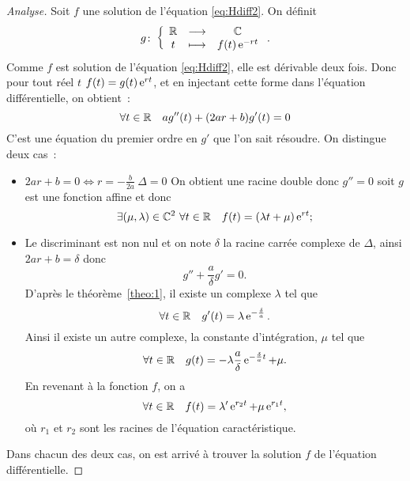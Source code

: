 \begin{proof}[Analyse] Soit $f$ une solution de l'équation \eqref{eq:Hdiff2}. On définit
  \begin{equation}
    g\colon \left\{\begin{array}{ccc} \mathbb{R} & \longrightarrow &\mathbb{C}\\ t & \longmapsto & f(t)\operatorname{e}^{-rt} \end{array} \right..
  \end{equation}
  Comme $f$ est solution de l'équation \eqref{eq:Hdiff2}, elle est dérivable deux fois. Donc pour tout réel $t$ $f(t)=g(t) \operatorname{e}^{rt}$, et en injectant cette forme dans l'équation différentielle, on obtient~:
\begin{equation}
  \forall t \in \mathbb{R} \quad ag''(t)+(2ar+b)g'(t)=0
\end{equation}
C'est une équation du premier ordre en $g'$ que l'on sait résoudre. On distingue deux cas~:
\begin{itemize}
\item $2ar+b=0 \iff r=-\frac{b}{2a} \ \Delta = 0$ On obtient une racine double donc $g''=0$ soit $g$ est une fonction affine et donc 
  \begin{equation}
   \exists (\mu,\lambda) \in \mathbb{C}^2 \ \forall t \in \mathbb{R} \quad f(t)=(\lambda t+\mu)\operatorname{e}^{rt};
  \end{equation}
\item Le discriminant est non nul et on note $\delta$ la racine carrée complexe de $\Delta$, ainsi $2ar+b=\delta$ donc 
  \begin{equation}
    g''+\frac{a}{\delta} g'=0.
  \end{equation}
D'après le théorème~\ref{theo:1}, il existe un complexe $\lambda$ tel que
\begin{equation}
  \forall t \in \mathbb{R} \quad g'(t)=\lambda \operatorname{e}^{-\frac{\delta}{a}}.
\end{equation}
Ainsi il existe un autre complexe, la constante d'intégration, $\mu$ tel que
\begin{equation}
 \forall t \in \mathbb{R} \quad g(t)=-\lambda \frac{a}{\delta} \operatorname{e}^{-\frac{\delta}{a} t} + \mu. 
\end{equation}
En revenant à la fonction $f$, on a
\begin{equation}
  \forall t \in \mathbb{R} \quad f(t)=\lambda' \operatorname{e}^{r_2 t} + \mu \operatorname{e}^{r_1 t},
\end{equation}
où $r_1$ et $r_2$ sont les racines de l'équation caractéristique.
\end{itemize}
Dans chacun des deux cas, on est arrivé à trouver la solution $f$ de l'équation différentielle.
\end{proof}
